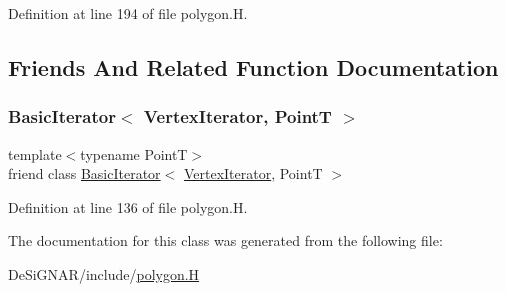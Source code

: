 Definition at line 194 of file polygon.\+H.



\subsection{Friends And Related Function Documentation}
\mbox{\label{class_designar_1_1_gen_polygon_1_1_vertex_iterator_a580630487e8bbe9b1152cc636325bee6}} 
\subsubsection{\texorpdfstring{Basic\+Iterator$<$ Vertex\+Iterator, Point\+T $>$}{BasicIterator< VertexIterator, PointT >}}
{\footnotesize\ttfamily template$<$typename PointT$>$ \\
friend class \hyperlink{class_designar_1_1_basic_iterator}{Basic\+Iterator}$<$ \hyperlink{class_designar_1_1_gen_polygon_1_1_vertex_iterator}{Vertex\+Iterator}, PointT $>$\hspace{0.3cm}{\ttfamily [friend]}}



Definition at line 136 of file polygon.\+H.



The documentation for this class was generated from the following file\+:\begin{DoxyCompactItemize}
\item 
De\+Si\+G\+N\+A\+R/include/\hyperlink{polygon_8_h}{polygon.\+H}\end{DoxyCompactItemize}
